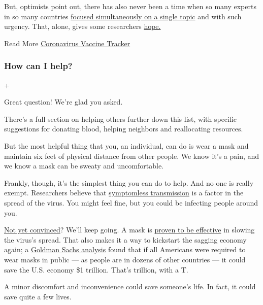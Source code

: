 But, optimists point out, there has also never been a time when so many
experts in so many countries
\href{https://www.nytimes.com/2020/04/01/world/europe/coronavirus-science-research-cooperation.html}{focused
simultaneously on a single topic} and with such urgency. That, alone,
gives some researchers
\href{https://www.nytimes.com/2020/05/20/health/coronavirus-vaccines.html}{hope.}

 Read More
\href{https://www.nytimes.com/interactive/2020/science/coronavirus-vaccine-tracker.html}{Coronavirus
Vaccine Tracker}

\hypertarget{how-can-i-help}{%
\subsubsection{How can I help?}\label{how-can-i-help}}

+

Great question! We're glad you asked.

There's a full section on helping others further down this list, with
specific suggestions for donating blood, helping neighbors and
reallocating resources.

But the most helpful thing that you, an individual, can do is wear a
mask and maintain six feet of physical distance from other people. We
know it's a pain, and we know a mask can be sweaty and uncomfortable.

Frankly, though, it's the simplest thing you can do to help. And no one
is really exempt. Researchers believe that
\href{https://www.nytimes.com/2020/06/27/world/europe/coronavirus-spread-asymptomatic.html}{symptomless
transmission} is a factor in the spread of the virus. You might feel
fine, but you could be infecting people around you.

\href{https://www.nytimes.com/2020/06/02/health/coronavirus-face-masks-surveys.html}{Not
yet convinced}? We'll keep going. A mask is
\href{https://www.cdc.gov/coronavirus/2019-ncov/prevent-getting-sick/cloth-face-cover-guidance.html}{proven
to be effective} in slowing the virus's spread. That also makes it a way
to kickstart the sagging economy again; a
\href{https://www.forbes.com/sites/sarahhansen/2020/06/30/a-national-mask-mandate-could-save-the-us-economy-1-trillion-goldman-sachs-says/\#1083f1e56f18}{Goldman
Sachs analysis} found that if all Americans were required to wear masks
in public --- as people are in dozens of other countries --- it could
save the U.S. economy \$1 trillion. That's trillion, with a T.

A minor discomfort and inconvenience could save someone's life. In fact,
it could save quite a few lives.

